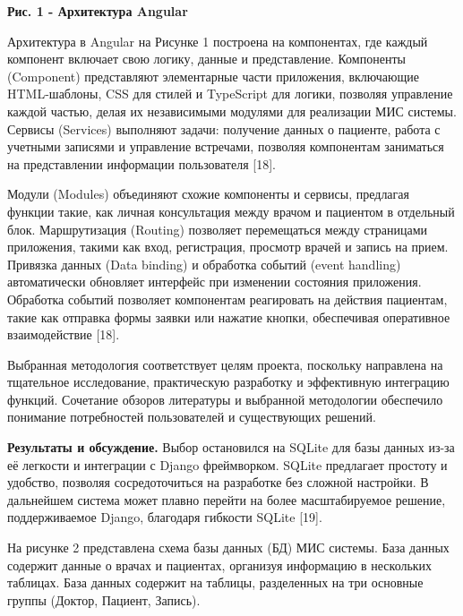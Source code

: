 {\bfseries Рис. 1 - Архитектура Angular}

Архитектура в Angular на Рисунке 1 построена на компонентах, где каждый
компонент включает свою логику, данные и представление. Компоненты
(Component) представляют элементарные части приложения, включающие
HTML-шаблоны, CSS для стилей и TypeScript для логики, позволяя
управление каждой частью, делая их независимыми модулями для реализации
МИС системы. Сервисы (Services) выполняют задачи: получение данных о
пациенте, работа с учетными записями и управление встречами, позволяя
компонентам заниматься на представлении информации пользователя
{[}18{]}.

Модули (Modules) объединяют схожие компоненты и сервисы, предлагая
функции такие, как личная консультация между врачом и пациентом в
отдельный блок. Маршрутизация (Routing) позволяет перемещаться между
страницами приложения, такими как вход, регистрация, просмотр врачей и
запись на прием. Привязка данных (Data binding) и обработка событий
(event handling) автоматически обновляет интерфейс при изменении
состояния приложения. Обработка событий позволяет компонентам
реагировать на действия пациентам, такие как отправка формы заявки или
нажатие кнопки, обеспечивая оперативное взаимодействие {[}18{]}.

Выбранная методология соответствует целям проекта, поскольку направлена
на тщательное исследование, практическую разработку и эффективную
интеграцию функций. Сочетание обзоров литературы и выбранной методологии
обеспечило понимание потребностей пользователей и существующих решений.

{\bfseries Результаты и обсуждение.} Выбор остановился на SQLite для базы
данных из-за её легкости и интеграции с Django фреймворком. SQLite
предлагает простоту и удобство, позволяя сосредоточиться на разработке
без сложной настройки. В дальнейшем система может плавно перейти на
более масштабируемое решение, поддерживаемое Django, благодаря гибкости
SQLite {[}19{]}.

На рисунке 2 представлена схема базы данных (БД) МИС системы. База
данных содержит данные о врачах и пациентах, организуя информацию в
нескольких таблицах. База данных содержит на таблицы, разделенных на три
основные группы (Доктор, Пациент, Запись).

